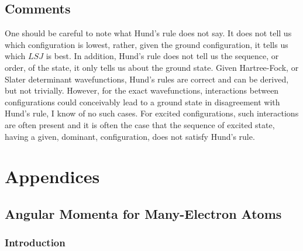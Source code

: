 \subsection{Comments}

One should be careful to note what Hund's rule does not say.  It does 
not tell us which configuration is lowest, rather, given the ground 
configuration, it tells us which $LSJ$ is best.  In addition, Hund's 
rule does not tell us the sequence, or order, of the state, it only 
tells us about the ground state.  Given Hartree-Fock, or Slater 
determinant wavefunctions, Hund's rules are correct and can be 
derived, but not trivially.  However, for the exact wavefunctions, 
interactions between configurations could conceivably lead to a ground 
state in disagreement with Hund's rule, I know of no such cases.  For 
excited configurations, such interactions are often present and it is 
often the case that the sequence of excited state, having a given, 
dominant, configuration, does not satisfy Hund's rule.


\section{Appendices}

\subsection{Angular Momenta for Many-Electron Atoms}

\subsubsection{Introduction}

